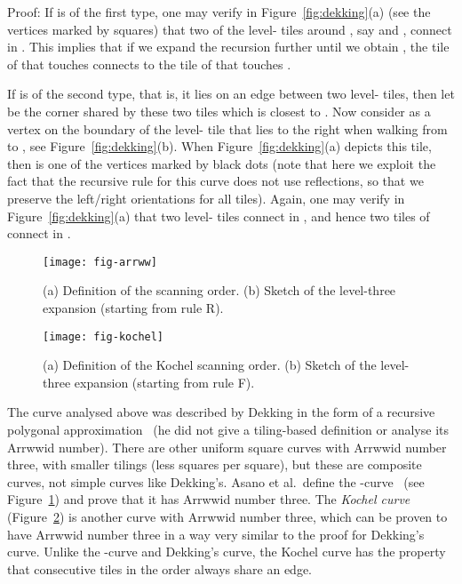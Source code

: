\documentclass[11pt,a4paper]{article}
\newcommand{\ARRWW}{\xspace}
\newenvironment{proof}{Proof:}{\qed}
\def\squareforqed{\hbox{\rlap{}}}
\def\qed{\ifmmode\squareforqed\else{\unskip\nobreak\hfil
\penalty50\hskip1em\null\nobreak\hfil\squareforqed
\parfillskip=0pt\finalhyphendemerits=0\endgraf}\fi}
\begin{document}
\begin{proof}
If  is of the first type, one may verify in Figure~\ref{fig:dekking}(a) (see the vertices marked by squares) that two of the level- tiles around , say  and , connect in . This implies that if we expand the recursion further until we obtain , the tile of  that touches  connects to the tile of  that touches .

If  is of the second type, that is, it lies on an edge between two level- tiles, then let  be the corner shared by these two tiles which is closest to . Now consider  as a vertex on the boundary of the level- tile that lies to the right when walking from  to , see Figure~\ref{fig:dekking}(b). When Figure~\ref{fig:dekking}(a) depicts this tile, then  is one of the vertices marked by black dots (note that here we exploit the fact that the recursive rule for this curve does not use reflections, so that we preserve the left/right orientations for all tiles). Again, one may verify in Figure~\ref{fig:dekking}(a) that two level- tiles connect in , and hence two tiles of  connect in .
\end{proof}

\begin{figure}
\centering
\texttt{[image: fig-arrww]}
\caption{(a) Definition of the \ARRWW scanning order. (b) Sketch of the level-three expansion (starting from rule \textsf{R}).}
\label{fig:arrww}
\end{figure}

\begin{figure}
\centering
\texttt{[image: fig-kochel]}
\caption{(a) Definition of the Kochel scanning order. (b) Sketch of the level-three expansion (starting from rule \textsf{F}).}
\label{fig:kochel}
\end{figure}

The curve analysed above was described by Dekking in the form of a recursive polygonal approximation~\cite{Dekking1982} (he did not give a tiling-based definition or analyse its Arrwwid number). There are other uniform square curves with Arrwwid number three, with smaller tilings (less squares per square), but these are composite curves, not simple curves like Dekking's. Asano et al.\ define the \ARRWW-curve~\cite{Asano1997} (see Figure~\ref{fig:arrww}) and prove that it has Arrwwid number three. The \emph{Kochel curve} (Figure~\ref{fig:kochel}) is another curve with Arrwwid number three, which can be proven to have Arrwwid number three in a way very similar to the proof for Dekking's curve. Unlike the \ARRWW-curve and Dekking's curve, the Kochel curve has the property that consecutive tiles in the order always share an edge.
\end{document}
